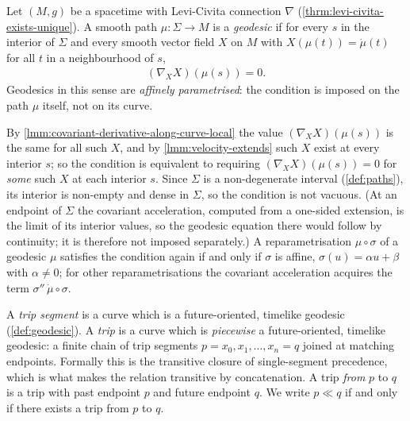 \begin{definition}[Geodesic]
    \label{def:geodesic}
    \leanok
    Let $(M,g)$ be a spacetime with Levi-Civita connection $\nabla$ (\ref{thrm:levi-civita-exists-unique}). A smooth path $\mu : \Sigma \to M$ is a \textit{geodesic} if for every $s$ in the interior of $\Sigma$ and every smooth vector field $X$ on $M$ with $X(\mu(t)) = \dot\mu(t)$ for all $t$ in a neighbourhood of $s$,
    \begin{align}
        (\nabla_X X)(\mu(s)) = 0.
    \end{align}
    Geodesics in this sense are \emph{affinely parametrised}: the condition is imposed on the path $\mu$ itself, not on its curve.

    By \ref{lmm:covariant-derivative-along-curve-local} the value $(\nabla_X X)(\mu(s))$ is the same for all such $X$, and by \ref{lmm:velocity-extends} such $X$ exist at every interior $s$; so the condition is equivalent to requiring $(\nabla_X X)(\mu(s)) = 0$ for \emph{some} such $X$ at each interior $s$. Since $\Sigma$ is a non-degenerate interval (\ref{def:paths}), its interior is non-empty and dense in $\Sigma$, so the condition is not vacuous. (At an endpoint of $\Sigma$ the covariant acceleration, computed from a one-sided extension, is the limit of its interior values, so the geodesic equation there would follow by continuity; it is therefore not imposed separately.) A reparametrisation $\mu \circ \sigma$ of a geodesic $\mu$ satisfies the condition again if and only if $\sigma$ is affine, $\sigma(u) = \alpha u + \beta$ with $\alpha \neq 0$; for other reparametrisations the covariant acceleration acquires the term $\sigma''\,\dot\mu \circ \sigma$.
\end{definition}

\begin{definition}[Trip]
    \label{def:trip}
    \leanok
    A \textit{trip segment} is a curve which is a future-oriented, timelike geodesic (\ref{def:geodesic}). A \textit{trip} is a curve which is \emph{piecewise} a future-oriented, timelike geodesic: a finite chain of trip segments $p = x_0, x_1, \dots, x_n = q$ joined at matching endpoints. Formally this is the transitive closure of single-segment precedence, which is what makes the relation transitive by concatenation. A trip \textit{from} $p$ to $q$ is a trip with past endpoint $p$ and future endpoint $q$. We write $p \ll q$ if and only if there exists a trip from $p$ to $q$.
\end{definition}

